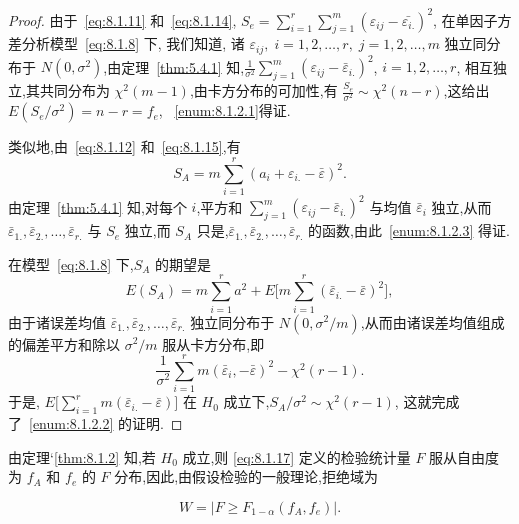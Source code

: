 \begin{proof}
由于~\eqref{eq:8.1.11} 和~\eqref{eq:8.1.14}, $S_{e}=\sum\limits_{i=1}^{r} \sum\limits_{j=1}^{m}(\varepsilon_{i j}-\bar{\varepsilon_{i.}})^{2}$, 在单因子方差分析模型~\eqref{eq:8.1.8} 下, 我们知道, 诸 $\varepsilon_{ij}, \; i=1,2,\ldots,r,\; j=1,2,\ldots,m$ 独立同分布于 $N(0,\sigma^2)$,由定理~\ref{thm:5.4.1} 知,$\tfrac{1}{\sigma^2} \sum\limits_{j=1}^m (\varepsilon_{ij} - \bar{\varepsilon}_{i.})^2$, $i=1,2,\ldots,r$, 相互独立,其共同分布为 $\chi^2(m-1)$,由卡方分布的可加性,有 $\tfrac{S_e}{\sigma^2} \sim \chi^2(n-r)$,这给出 $E(S_e/\sigma^2) = n-r=f_e$, ~\ref{enum:8.1.2.1}得证.

类似地,由~\eqref{eq:8.1.12} 和~\eqref{eq:8.1.15},有
\begin{equation*}
  S_A =  m \sum_{i=1}^r (a_i + \varepsilon_{i.} - \bar{\varepsilon})^2.
\end{equation*}
由定理~\ref{thm:5.4.1} 知,对每个 $i$,平方和 $\sum\limits_{j=1}^m (\varepsilon_{ij} - \bar{\varepsilon}_{i.})^2$ 与均值 $\bar{\varepsilon}_{i}$ 独立,从而 $\bar{\varepsilon}_{1.}, \bar{\varepsilon}_{2.},\ldots,\bar{\varepsilon}_{r.}$ 与 $S_e$ 独立,而 $S_A$ 只是,$\bar{\varepsilon}_{1.}, \bar{\varepsilon}_{2.},\ldots,\bar{\varepsilon}_{r.}$ 的函数,由此~\ref{enum:8.1.2.3} 得证.

在模型~\ref{eq:8.1.8} 下,$S_A$ 的期望是
\begin{equation*}
  E(S_A) = m \sum_{i=1}^r a^2 + E\big[m\sum_{i=1}^r (\bar{\varepsilon}_{i.} - \bar{\varepsilon})^2\big],
\end{equation*}
由于诸误差均值 $\bar{\varepsilon}_{1.}, \bar{\varepsilon}_{2.},\ldots,\bar{\varepsilon}_{r.}$ 独立同分布于 $N(0, \sigma^2/m)$,从而由诸误差均值组成的偏差平方和除以 $\sigma^2/m$ 服从卡方分布,即
\begin{equation*}
  \frac{1}{\sigma^{2}} \sum_{i=1}^{r} m\left(\bar{\varepsilon}_{i},-\bar{\varepsilon}\right)^{2}-\chi^{2}(r-1).
\end{equation*}
于是, $E\big[\sum\limits_{i=1}^r m(\bar{\varepsilon}_{i.} - \bar{\varepsilon})\big]$ 在 $H_0$ 成立下,$S_A/\sigma^2 \sim \chi^2(r-1)$, 这就完成了~\ref{enum:8.1.2.2} 的证明.
\end{proof}

由定理`\ref{thm:8.1.2} 知,若 $H_0$ 成立,则 \eqref{eq:8.1.17} 定义的检验统计量 $F$ 服从自由度为 $f_A$ 和 $f_e$ 的 $F$ 分布,因此,由假设检验的一般理论,拒绝域为

\begin{equation}\label{eq:8.1.18}
W =\left\lvert F \geq F_{1-\alpha}(f_{A}, f_{e}) \right\rvert .
\end{equation}

